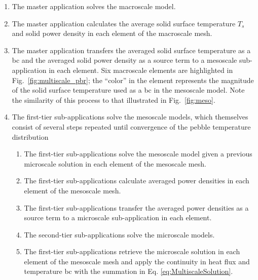 \begin{enumerate}
\itemsep0.3em
\item The master application solves the macroscale model.
\item The master application calculates the average solid surface temperature \(T_s\) and solid power density in each element of the macroscale mesh.
\item The master application transfers the averaged solid surface temperature as a \gls{bc} and the averaged solid power density as a source term to a mesoscale sub-application in each element. Six macroscale elements are highlighted in Fig.\ \ref{fig:multiscale_pbr}; the ``color'' in the element represents the magnitude of the solid surface temperature used as a \gls{bc} in the mesoscale model. Note the similarity of this process to that illustrated in Fig.\ \ref{fig:meso}.
\item The first-tier sub-applications solve the mesoscale models, which themselves consist of several steps repeated until convergence of the pebble temperature distribution\mdash
	\begin{enumerate}
  \itemsep0.3em
	\item The first-tier sub-applications solve the mesoscale model given a previous microscale solution in each element of the mesoscale mesh.
	\item The first-tier sub-applications calculate averaged power densities in each element of the mesoscale mesh.
	\item The first-tier sub-applications transfer the averaged power densities as a source term to a microscale sub-application in each element.
	\item The second-tier sub-applications solve the microscale models.
	\item The first-tier sub-applications retrieve the microscale solution in each element of the mesoscale mesh and apply the continuity in heat flux and temperature \gls{bc} with the summation in Eq. \eqref{eq:MultiscaleSolution}.
	\end{enumerate}
\end{enumerate}


